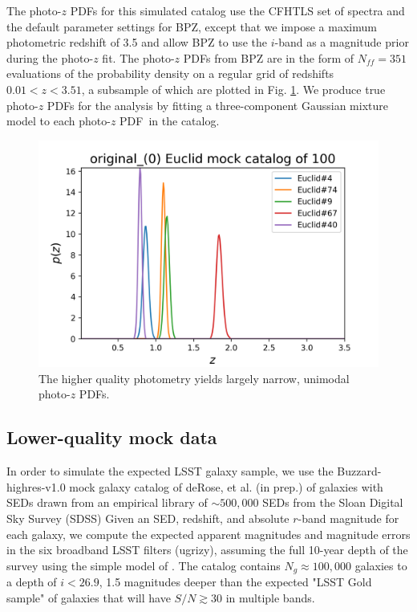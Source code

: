 \documentclass[\docopts]{\docclass}
\newcommand{\pz}{photo-$z$ PDF}
\begin{document}
The \pz s for this simulated catalog use the CFHTLS set of spectra 
\citep{ilbert_accurate_2006} and the default parameter settings for BPZ, except 
that we impose a maximum photometric redshift of 3.5 and allow BPZ to use the 
$i$-band as a magnitude prior during the photo-$z$ fit. The \pz s from BPZ are 
in the form of $N_{ff} = 351$ evaluations of the probability density on a 
regular grid of redshifts $0.01 < z < 3.51$, a subsample of which are plotted 
in Fig. \ref{fig:euclid_pzs}.  We produce true \pz s for the analysis by 
fitting a three-component Gaussian mixture model to each \pz\ in the catalog.

\begin{figure}
  \includegraphics[width=0.9\columnwidth]{figures/euclid_pzs.png}
  \caption{The higher quality photometry yields largely narrow, unimodal \pz s.
  \label{fig:euclid_pzs}}
\end{figure}

\subsection{Lower-quality mock data}
\label{sec:LSST}

In order to simulate the expected LSST galaxy sample, we use the 
Buzzard-highres-v1.0 mock galaxy catalog of deRose, et al. (in prep.) of 
galaxies with SEDs drawn from an empirical library of $\sim500,000$ SEDs from 
the Sloan Digital Sky Survey (SDSS)
Given an SED, redshift, and absolute $r$-band magnitude for each galaxy, we 
compute the expected apparent magnitudes and magnitude errors in the six 
broadband LSST filters (ugrizy), assuming the full 10-year depth of the survey 
using the simple model of \citet{ivezic_lsst:_2008}.  The catalog contains 
$N_{g}\approx100,000$ galaxies to a depth of $i<26.9$, 1.5 magnitudes deeper 
than the expected "LSST Gold sample" of galaxies that will have $S/N\gtrsim30$ 
in multiple bands.
\end{document}
